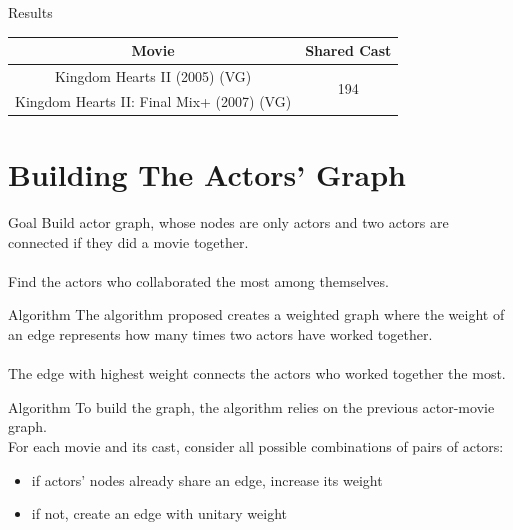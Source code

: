 \begin{frame}{Results}
\centering
\begin{tabular}{ c|c } 
Movie & Shared Cast \\
\hline \hline
Kingdom Hearts II (2005) (VG) & \multirow{2}{*}{194} \\ 
Kingdom Hearts II: Final Mix+ (2007) (VG) \\
\end{tabular}
\end{frame}
\section{Building The Actors' Graph}
\begin{frame}{Goal}
Build actor graph, whose nodes are only actors and two actors are connected if they did a movie together. \\ \ \\
Find the actors who collaborated the most among themselves.
\end{frame}
\begin{frame}{Algorithm}
The algorithm proposed creates a weighted graph where the weight of an edge represents how many times two actors have worked together. 
\\ \ \\
The edge with highest weight connects the actors who worked together the most.
    
\end{frame}
\begin{frame}[fragile]{Algorithm}
To build the graph, the algorithm relies on the previous actor-movie graph. \\ For each movie and its cast, consider all possible combinations of pairs of actors:
\begin{itemize}
    \item if actors' nodes already share an edge, increase its weight
    \item if not, create an edge with unitary weight
\end{itemize}
\pause
\end{frame}

